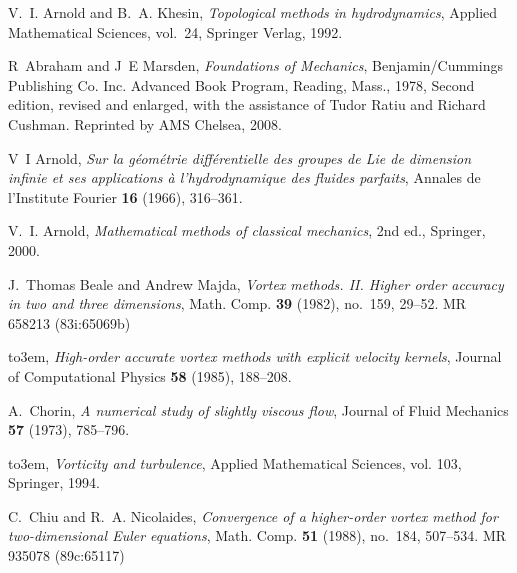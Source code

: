\documentclass[12pt]{amsart}
\theoremstyle{remark}
\begin{document}
%
%


\providecommand{\bysame}{\leavevmode\hbox to3em{\hrulefill}\thinspace}
\providecommand{\MR}{\relax\ifhmode\unskip\space\fi MR }
\providecommand{\MRhref}[2]{%
  \href{http://www.ams.org/mathscinet-getitem?mr=#1}{#2}
}
\providecommand{\href}[2]{#2}
\begin{thebibliography}{FDMM91}

V.~I. Arnold and B.~A. Khesin, \emph{Topological methods in hydrodynamics},
  Applied Mathematical Sciences, vol.~24, Springer Verlag, 1992.

R~Abraham and J~E Marsden, \emph{Foundations of {M}echanics}, Benjamin/Cummings
  Publishing Co. Inc. Advanced Book Program, Reading, Mass., 1978, Second
  edition, revised and enlarged, with the assistance of Tudor Ratiu and Richard
  Cushman. Reprinted by AMS Chelsea, 2008.

V~I Arnold, \emph{Sur la g\'{e}om\'{e}trie diff\'{e}rentielle des groupes de
  {L}ie de dimension infinie et ses applications \`{a} l'hydrodynamique des
  fluides parfaits}, Annales de l'Institute Fourier \textbf{16} (1966),
  316--361.

V.~I. Arnold, \emph{Mathematical methods of classical mechanics}, 2nd ed.,
  Springer, 2000.

J.~Thomas Beale and Andrew Majda, \emph{Vortex methods. {II}. {H}igher order
  accuracy in two and three dimensions}, Math. Comp. \textbf{39} (1982),
  no.~159, 29--52. \MR{658213 (83i:65069b)}

\bysame, \emph{High-order accurate vortex methods with explicit velocity
  kernels}, Journal of Computational Physics \textbf{58} (1985), 188--208.

A.~Chorin, \emph{A numerical study of slightly viscous flow}, Journal of Fluid
  Mechanics \textbf{57} (1973), 785--796.

\bysame, \emph{Vorticity and turbulence}, Applied Mathematical Sciences, vol.
  103, Springer, 1994.

C.~Chiu and R.~A. Nicolaides, \emph{Convergence of a higher-order vortex method
  for two-dimensional {E}uler equations}, Math. Comp. \textbf{51} (1988),
  no.~184, 507--534. \MR{935078 (89c:65117)}


\end{thebibliography}
\end{document}
